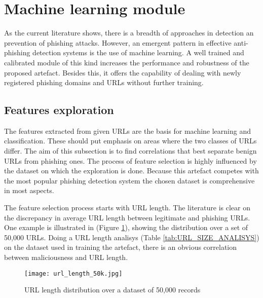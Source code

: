 \section{Machine learning module}
As the current literature shows, there is a breadth of approaches in detection an prevention of phishing attacks. However, an emergent pattern in effective anti-phishing detection systems is the use of machine learning. A well trained and calibrated module of this kind increases the performance and robustness of the proposed artefact. Besides this, it offers the capability of dealing with newly registered phishing domains and URLs without further training.

\subsection{Features exploration}
The features extracted from given URLs are the basis for machine learning and classification. These should put emphasis on areas where the two classes of URLs differ. The aim of this subsection is to find correlations that best separate benign URLs from phishing ones. The process of feature selection is highly influenced by the dataset on which the exploration is done. Because this artefact competes with the most popular phishing detection system the chosen dataset is comprehensive in most aspects.

The feature selection process starts with URL length. The literature is clear on the discrepancy in average URL length between legitimate and phishing URLs. One example is illustrated in \cite{STACKED_ML_URL_HTML} (Figure \ref{fig:URL_LENGTH_DISTRIBUTION}), showing the distribution over a set of 50,000 URLs. Doing a URL length analisys (Table \ref{tab:URL_SIZE_ANALISYS}) on the dataset used in training the artefact, there is an obvious correlation between maliciousness and URL length.

\begin{figure}[t]
	\centering
	\texttt{[image: url\_length\_50k.jpg]}
	\caption{URL length distribution over a dataset of 50,000 records}
	\label{fig:URL_LENGTH_DISTRIBUTION}
\end{figure}

